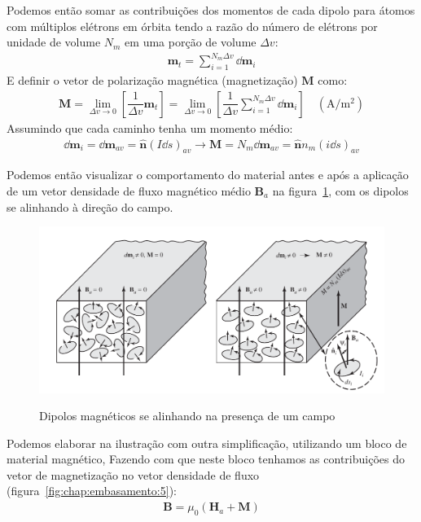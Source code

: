 \documentclass[
        12pt,                           %
        openright,                      %
        twoside,                        %
        a4paper,                        %
        english,                        %
        french,                         %
        spanish,                        %
        brazil                          %
        ]{abntex2}
\begin{document}
Podemos então somar as contribuições dos momentos de cada dipolo para átomos com
múltiplos elétrons em órbita tendo a razão do número de elétrons por unidade de
volume $N_m$ em uma porção de volume $\Delta v$:
\begin{gather}
\bm{m}_t = \sum_{i = 1}^{N_m \Delta v}{\dd{\bm{m}_i}}
\end{gather}
E definir o vetor de polarização magnética (magnetização) $\bm{M}$ como:
\begin{gather}
  \bm{M} = \underset{\Delta v \to 0}{\lim} \left[ \dfrac{1}{\Delta v}\bm{m}_t \right] = 
  \underset{\Delta v \to 0}{\lim} \left[ \dfrac{1}{\Delta v} \sum_{i = 1}^{N_m \Delta v}{\dd{\bm{m}_i}} \right]
  \quad (\text{A}/\text{m}^2)
\end{gather}
Assumindo que cada caminho tenha um momento médio:
\begin{gather}
  \dd \bm{m}_i = \dd \bm{m}_{av} = \bm{\hat{n}}(I \dd s)_{av} \to
  \bm{M} = N_m \dd \bm{m}_{av} = \bm{\hat{n}} n_m (i \dd s)_{av}
\end{gather}

Podemos então visualizar o comportamento do material antes e após a aplicação de um
vetor densidade de fluxo magnético médio $\bm{B}_a$ na figura~\ref{fig:chap:embasamento:4},
com os dipolos se alinhando à direção do campo.

\begin{figure}[!htp]
  \centering
  \includegraphics[width=0.9\columnwidth]{balanis2.png}
  \label{fig:chap:embasamento:4}
  \caption{Dipolos magnéticos se alinhando na presença de um campo \cite{book:balanis}}
\end{figure}

Podemos elaborar na ilustração com outra simplificação, utilizando um bloco de material
magnético, Fazendo com que neste bloco tenhamos as contribuições do vetor de magnetização
no vetor densidade de fluxo (figura~\ref{fig:chap:embasamento:5}):
\begin{gather}
  \bm{B} = \mu_0 (\bm{H}_a + \bm{M})
\end{gather}
\end{document}
